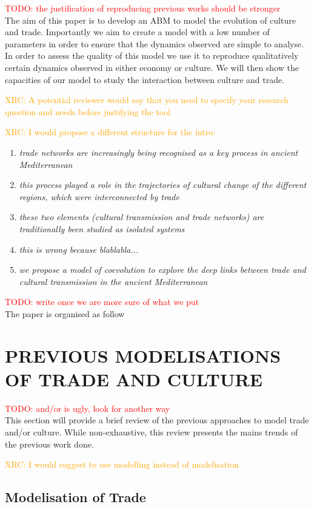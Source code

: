 \documentclass{wscpaperproc}
\newcommand{\memo}[2]{\textcolor{#1}{#2}}
\newcommand{\todo}[1]{\memo{red}{TODO: #1\\}}
\newcommand{\xrc}[1]{\memo{orange}{XRC: #1\\}}
\begin{document}
\todo{the justification of reproducing previous works should be stronger}
The aim of this paper is to develop an ABM to model the evolution of culture and trade. Importantly we aim to create a model with a low number of parameters in order to ensure that the dynamics observed are simple to analyse. In order to assess the quality of this model we use it to reproduce qualitatively certain dynamics observed in either economy or culture. We will then show the capacities of our model to study the interaction between culture and trade.

\xrc{A potential reviewer would say that you need to specify your research question and needs before justifying the tool}

\xrc{I would propose a different structure for the intro:}
\begin{enumerate}
    \item \emph{trade networks are increasingly being recognised as a key process in ancient Mediterranean}
    \item \emph{this process played a role in the trajectories of cultural change of the different regions, which were interconnected by trade}
    \item \emph{these two elements (cultural transmission and trade networks) are traditionally been studied as isolated systems}
    \item \emph{this is wrong because blablabla...}
    \item \emph{we propose a model of coevolution to explore the deep links between trade and cultural transmission in the ancient Mediterranean}
\end{enumerate}

\todo{write once we are more sure of what we put}
The paper is organised as follow

\section{PREVIOUS MODELISATIONS OF TRADE AND CULTURE}

\todo{and/or is ugly, look for another way}
This section will provide a brief review of the previous approaches to model trade and/or culture. While non-exhaustive, this review presents the mains trends of the previous work done.

\xrc{I would suggest to use modelling instead of modelisation}
\subsection{Modelisation of Trade}
\end{document}
